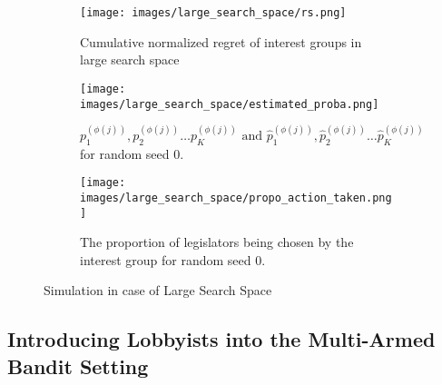 \documentclass{article}
\begin{document}
\begin{figure}[h!]
    \centering %
    \begin{subfigure}[b]{0.45\textwidth}
        
        \texttt{[image: images/large\_search\_space/rs.png]}
        
        \caption{Cumulative normalized regret of interest groups in large search space}
        \label{fig:rs_lg}
    \end{subfigure}
    \hfill
    \begin{subfigure}[b]{0.45\textwidth}
        \texttt{[image: images/large\_search\_space/estimated\_proba.png]}
        \caption{$p_1^{(\phi(j))}, p_2^{(\phi(j))} \hdots p_K^{(\phi(j))} \text{ and } \hat{p}_1^{(\phi(j))}, \hat{p}_2^{(\phi(j))} \hdots \hat{p}_K^{(\phi(j))}$ for random seed $0$.}
        \label{fig:lgproba}
    \end{subfigure}

    \begin{subfigure}[b]{1\columnwidth}
        \centering
        \texttt{[image: images/large\_search\_space/propo\_action\_taken.png]}
        \caption{The proportion of legislators being chosen by the interest group for random seed $0$.}
        \label{fig:lgpropo}
    \end{subfigure}
    \caption{Simulation in case of Large Search Space}
\end{figure}

\subsection{Introducing Lobbyists into the Multi-Armed Bandit Setting}\label{arml}
\end{document}
